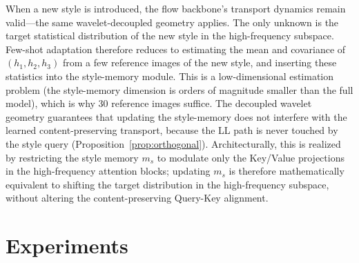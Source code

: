 \documentclass[letterpaper]{article}
\begin{document}
When a new style is introduced, the flow backbone's transport dynamics remain valid---the same wavelet-decoupled geometry applies.
The only unknown is the target statistical distribution of the new style in the high-frequency subspace.
Few-shot adaptation therefore reduces to estimating the mean and covariance of $(h_1,h_2,h_3)$ from a few reference images of the new style, and inserting these statistics into the style-memory module.
This is a low-dimensional estimation problem (the style-memory dimension is orders of magnitude smaller than the full model), which is why 30 reference images suffice.
The decoupled wavelet geometry guarantees that updating the style-memory does not interfere with the learned content-preserving transport, because the LL path is never touched by the style query (Proposition~\ref{prop:orthogonal}).
Architecturally, this is realized by restricting the style memory $m_s$ to modulate only the Key/Value projections in the high-frequency attention blocks; updating $m_s$ is therefore mathematically equivalent to shifting the target distribution in the high-frequency subspace, without altering the content-preserving Query-Key alignment.

\section{Experiments}
\label{sec:exp}
\end{document}

